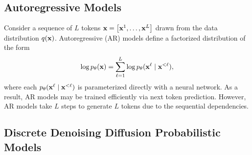 \documentclass{article} %
\newcommand{\vkl}[1]{\textcolor{blue}{[VK: #1]}}
\newcommand{\TODO}[1]{\textcolor{red}{[TODO: #1]}}
\begin{document}
\subsection{Autoregressive Models}
Consider a sequence of $L$ tokens ${\mathbf x} = \left[ {\mathbf x}^1, \dots, {\mathbf x}^L \right]$ drawn from the data distribution $q({\mathbf x})$. 
Autoregressive (AR) models define a factorized distribution of the form
\begin{align}\label{eq:ar-nll}
    \log p_\theta({\mathbf x}) = \sum_{\ell=1}^L \log p_\theta({\mathbf x}^\ell \mid {\mathbf x}^{<\ell}),
\end{align}
where each $p_\theta({\mathbf x}^\ell \mid {\mathbf x}^{<\ell})$ is parameterized directly with a neural network.
As a result, AR models may be trained efficiently via next token prediction. However, AR models take $L$ steps to generate $L$ tokens due to the sequential dependencies.

\subsection{Discrete Denoising Diffusion Probabilistic Models}
    
\end{document}
